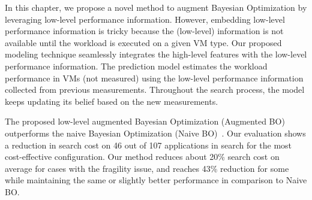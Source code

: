 In this chapter, we propose
a novel method to augment Bayesian Optimization
by leveraging low-level performance information.
However, embedding low-level performance information is tricky because the (low-level) information is not available until the workload is executed on a given VM type.
Our proposed modeling technique seamlessly integrates
the high-level features with the low-level performance information.
The prediction model estimates the workload performance
in VMs (not measured) using the
low-level performance information collected from previous measurements.
Throughout the search process, the model keeps updating its belief
based on the new measurements.

The proposed low-level augmented Bayesian Optimization (Augmented BO) outperforms
the naive Bayesian Optimization (Naive BO)~\cite{Alipourfard2017}.
Our evaluation shows a reduction in search cost on 46 out of 107 applications
in search for the most cost-effective configuration.
Our method reduces about 20\% search cost on average for cases
with the fragility issue, and reaches 43\% reduction for some
while maintaining the same or slightly better performance
in comparison to Naive BO.